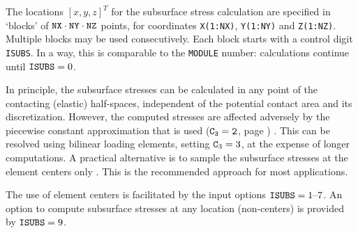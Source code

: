 \documentclass[12pt]{report}
\begin{document}
The locations $[x,y,z]^T$ for the subsurface stress calculation are
specified in `blocks' of ${\tt NX} \cdot {\tt NY} \cdot {\tt NZ}$ points,
for coordinates {\tt X(1:NX)}, {\tt Y(1:NY)} and {\tt Z(1:NZ)}. Multiple
blocks may be used consecutively. Each block starts with a control
digit {\tt ISUBS}. In a way, this is comparable to the {\tt MODULE} number:
calculations continue until ${\tt ISUBS}=0$. 

In principle, the subsurface stresses can be calculated in any point of
the contacting (elastic) half-spaces, independent of the potential contact
area and its discretization. However, the computed stresses
are affected adversely by the piecewise constant approximation that
is used ($\tt{C}_3=2$, page \pageref{c3-digit}) \cite{Love1929,
Wekken2019a-subsurf}. This can be resolved using bilinear loading elements,
setting ${\tt C}_3=3$, at the expense of longer computations. A practical
alternative is to sample the subsurface stresses at the element centers
only \cite{Wekken2019a-subsurf}. This is the recommended approach for most
applications.

The use of element centers is facilitated by the input options ${\tt 
ISUBS}=1\text{--}7$. An option to compute subsurface stresses at any
location (non-centers) is provided by ${\tt ISUBS}=9$.
\end{document}
